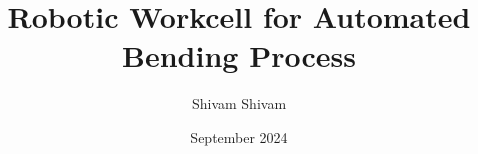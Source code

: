 \documentclass[12pt,a4paper,final]{report}
\begin{document}


\title{Robotic Workcell for Automated Bending Process}

\author{Shivam Shivam}

\date{September 2024}





\tableofcontents
\listoffigures
\listoftables



\newpage
\setcounter{page}{1}



















\setcounter{page}{0}

\printbibliography

\end{document}

